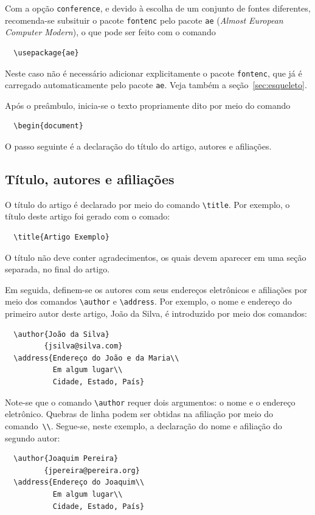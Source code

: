 \documentclass[conference,harvard,brazil,english]{sbatex}
\begin{document}
Com a opção \verb+conference+, e devido à escolha de um conjunto de
fontes diferentes, recomenda-se subsituir o pacote \verb+fontenc+ pelo
pacote \verb+ae+ (\emph{Almost European Computer Modern}), o que pode
ser feito com o comando
\begin{verbatim}
  \usepackage{ae}
\end{verbatim}
Neste caso não é necessário adicionar explicitamente o pacote
\verb+fontenc+, que já é carregado automaticamente pelo pacote
\verb+ae+. Veja também a seção~\ref{sec:esqueleto}.

Após o preâmbulo, inicia-se o texto propriamente dito por meio do
comando
\begin{verbatim}
  \begin{document}
\end{verbatim}
O passo seguinte é a declaração do título do artigo, autores e
afiliações.

\subsection{Título, autores e afiliações}

O título do artigo é declarado por meio do comando \verb+\title+. Por
exemplo, o título deste artigo foi gerado com o comado:
\begin{verbatim}
  \title{Artigo Exemplo}
\end{verbatim}
O título não deve conter agradecimentos, os quais devem aparecer em
uma seção separada, no final do artigo.

Em seguida, definem-se os autores com seus endereços eletrônicos e
afiliações por meio dos comandos \verb+\author+ e
\verb+\address+. Por exemplo, o nome e endereço do primeiro autor
deste artigo, João da Silva, é introduzido por meio dos comandos:
\begin{verbatim}
  \author{João da Silva}
         {jsilva@silva.com}
  \address{Endereço do João e da Maria\\
           Em algum lugar\\
           Cidade, Estado, País}
\end{verbatim}
Note-se que o comando \verb+\author+ requer dois argumentos: o nome e
o endereço eletrônico. Quebras de linha podem ser obtidas na afiliação
por meio do comando~\verb+\\+. Segue-se, neste exemplo, a declaração
do nome e afiliação do segundo autor:
\begin{verbatim}
  \author{Joaquim Pereira}
         {jpereira@pereira.org}
  \address{Endereço do Joaquim\\
           Em algum lugar\\
           Cidade, Estado, País}
\end{verbatim}
\end{document}
